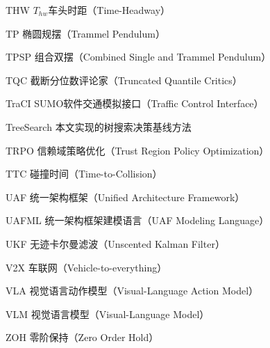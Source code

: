 \begin{denotation}[3cm]
  \item[THW] $T_{hw}$车头时距（Time-Headway）
  \item[TP] 椭圆规摆（Trammel Pendulum）
  \item[TPSP] 组合双摆（Combined Single and Trammel Pendulum）
  \item[TQC] 截断分位数评论家（Truncated Quantile Critics）
  \item[TraCI] SUMO软件交通模拟接口（Traffic Control Interface）
  \item[TreeSearch] 本文实现的树搜索决策基线方法
  \item[TRPO] 信赖域策略优化（Trust Region Policy Optimization）
  \item[TTC] 碰撞时间（Time-to-Collision）
  \item[UAF] 统一架构框架（Unified Architecture Framework）
  \item[UAFML] 统一架构框架建模语言（UAF Modeling Language）
  \item[UKF] 无迹卡尔曼滤波（Unscented Kalman Filter）
  \item[V2X] 车联网（Vehicle-to-everything）
  \item[VLA] 视觉语言动作模型（Visual-Language Action Model）
  \item[VLM] 视觉语言模型（Visual-Language Model）
  \item[ZOH] 零阶保持（Zero Order Hold）



\end{denotation}
